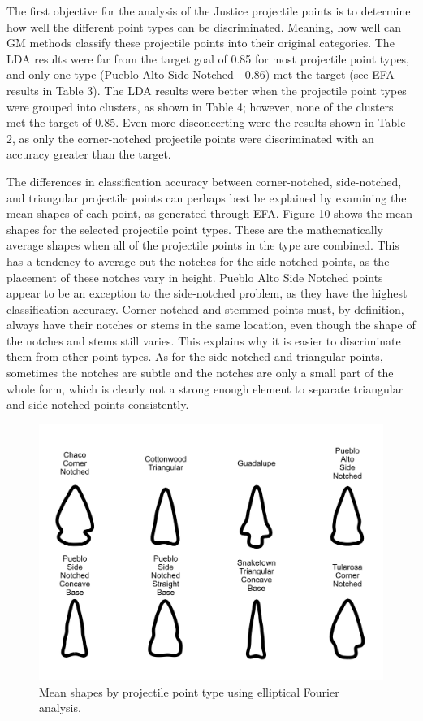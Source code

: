 \documentclass[letterpaper]{article}
\begin{document}
The first objective for the analysis of the Justice projectile points is to determine how well the different point types can be discriminated. Meaning, how well can GM methods classify these projectile points into their original categories. The LDA results were far from the target goal of 0.85 for most projectile point types, and only one type (Pueblo Alto Side Notched---0.86) met the target (see EFA results in Table 3). The LDA results were better when the projectile point types were grouped into clusters, as shown in Table 4; however, none of the clusters met the target of 0.85. Even more disconcerting were the results shown in Table 2, as only the corner-notched projectile points were discriminated with an accuracy greater than the target.

The differences in classification accuracy between corner-notched, side-notched, and triangular projectile points can perhaps best be explained by examining the mean shapes of each point, as generated through EFA. Figure 10 shows the mean shapes for the selected projectile point types. These are the mathematically average shapes when all of the projectile points in the type are combined. This has a tendency to average out the notches for the side-notched points, as the placement of these notches vary in height. Pueblo Alto Side Notched points appear to be an exception to the side-notched problem, as they have the highest classification accuracy. Corner notched and stemmed points must, by definition, always have their notches or stems in the same location, even though the shape of the notches and stems still varies. This explains why it is easier to discriminate them from other point types. As for the side-notched and triangular points, sometimes the notches are subtle and the notches are only a small part of the whole form, which is clearly not a strong enough element to separate triangular and side-notched points consistently.

\begin{figure}
\includegraphics[width=1\linewidth]{figures/meanShapesEFA} \caption{Mean shapes by projectile point type using elliptical Fourier analysis.}\label{fig:meanShapes}
\end{figure}
\end{document}

